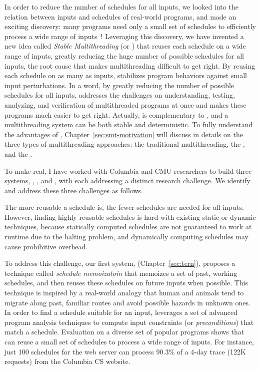 In order to reduce the number of schedules for all inputs, we looked into the
relation between inputs and schedules of real-world programs, and made an
exciting discovery: many programs need only a small set of schedules to
efficiently process a wide range of inputs~\cite{smt:cacm}! Leveraging this
discovery, we have invented a new idea called \emph{Stable Multithreading} (or 
\emph{\smt}) that reuses each schedule on a wide range of inputs, greatly 
reducing the huge number of possible schedules for all inputs, the root 
cause that makes multithreading difficult to get right. By reusing each 
schedule on as many as inputs, \smt stabilizes program behaviors 
against small input perturbations. In a 
word, by greatly reducing the number of possible schedules for all inputs, \smt 
addresses the challenges on understanding, testing, analyzing, and verification 
of multithreaded programs at once and makes these programs much 
easier to get right. Actually, \smt is complementary to \dmt, and a 
multithreading system can be both stable and deterministic. To fully understand 
the advantages of \smt, Chapter~\ref{sec:smt-motivation} will discuss in 
details on the three types of multithreading approaches: the traditional 
multithreading, the \dmt, and the \smt.


To make \smt real, I have worked with Columbia and CMU researchers to build
three \smt systems, \tern, \peregrine, and \parrot, with 
each addressing a distinct research challenge. We identify and address these 
three challenges as follows.

 The more reusable a schedule is, the fewer schedules are needed for 
all inputs.
However, finding highly reusable schedules is hard with existing static or
dynamic techniques, because statically computed schedules are not guaranteed to
work at runtime due to the halting problem, and dynamically computing schedules
may cause prohibitive overhead.

To address this challenge, our first \smt system, 
\tern (Chapter~\ref{sec:tern}), proposes a technique 
called \emph{schedule memoizatoin} that memoizes a set of past, working 
schedules, and then reuses these schedules on future inputs when possible. This 
technique is inspired by a real-world analogy that human and animals tend to 
migrate along past, familiar routes and avoid possible hazards in unknown ones. 
In order to find a schedule suitable for an input, \tern leverages a set of 
advanced program analysis techniques to compute input constraints (or 
\emph{preconditions}) that match a schedule. Evaluation on a diverse set of 
popular programs shows that \tern can reuse a small set of schedules to process 
a wide range of inputs. For instance, just 100 schedules for the \apache web 
server can process 90.3\% of a 4-day trace (122K requests) from the Columbia CS 
website.

